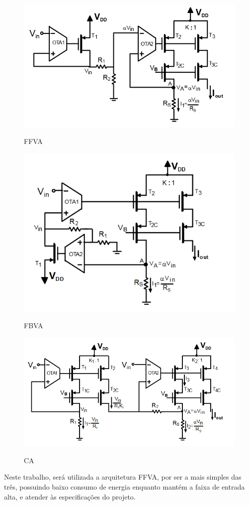 \documentclass[
	12pt,				%
	oneside,			%
	a4paper,			%
	english,			%
	french,				%
	spanish,			%
	brazil				%
	]{abntex2}
\begin{document}
\begin{figure}[H]
\centering
\begin{minipage}{.5\textwidth}
  \centering
  \includegraphics[width=.6\linewidth]{ffva.PNG}
  \caption{FFVA}
  \label{ffva}
\end{minipage}%
\begin{minipage}{.5\textwidth}
  \centering
  \includegraphics[width=.68\linewidth]{fbva.PNG}
  \caption{FBVA}
  \label{fbva}
\end{minipage}
\begin{minipage}{.5\textwidth}
  \centering
  \includegraphics[width=.68\linewidth]{ca.png}
  \caption{CA}
  \label{ca}
\end{minipage}
\end{figure}

Neste trabalho, será utilizada a arquitetura FFVA, por ser a mais simples das três, possuindo baixo consumo de energia enquanto mantém a faixa de entrada alta, e atender às especificações do projeto.
\end{document}

